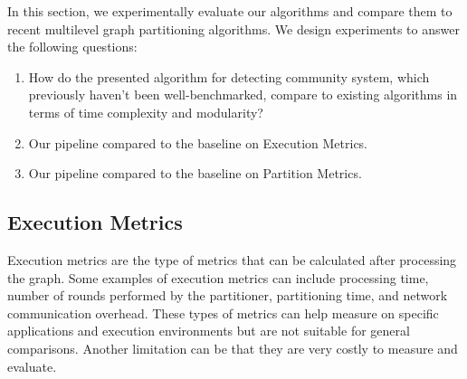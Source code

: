 
In this section, we experimentally evaluate our algorithms and compare them to recent multilevel graph partitioning algorithms.
We design experiments to answer the following questions:
\begin{enumerate}
  \item How do the presented algorithm for detecting community system, which previously haven't been well-benchmarked, compare to existing algorithms in terms of time complexity and modularity? 
  \item Our pipeline compared to the baseline on Execution Metrics. 
  \item Our pipeline compared to the baseline on Partition Metrics. 
\end{enumerate}
\subsection{Execution Metrics}
Execution metrics are the type of metrics that can be calculated after processing the graph. Some examples of execution metrics can include processing time, number of rounds performed by the partitioner, partitioning time, and network communication overhead. These types of metrics can help measure on specific applications and execution environments but are not suitable for general comparisons. Another limitation can be that they are very costly to measure and evaluate. 

